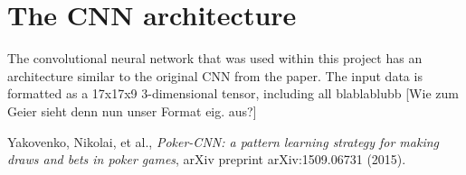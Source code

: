 \documentclass[]{report}
\begin{document}
\section{The CNN architecture}

The convolutional neural network that was used within this project has an architecture similar to the original CNN from the paper\cite{1}. The input data is formatted as a 17x17x9 3-dimensional tensor, including all blablablubb [Wie zum Geier sieht denn nun unser Format eig. aus?]




\begin{thebibliography}{}
	 Yakovenko, Nikolai, et al., \emph{Poker-CNN: a pattern learning strategy for making draws and bets in poker games}, arXiv preprint arXiv:1509.06731 (2015).
\end{thebibliography}  
\end{document}
